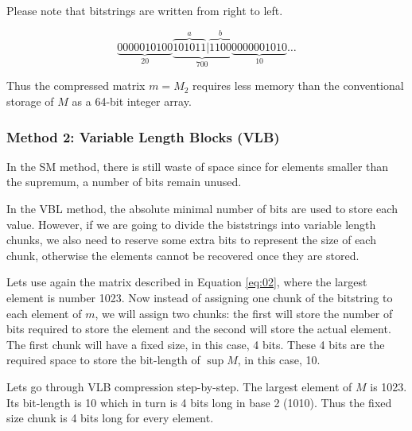 \documentclass[10pt]{article}
\begin{document}
 Please note that bitstrings are written from right to left.

\begin{equation*}\label{eq:8}
  \underbrace{0000010100}_{20}\underbrace{\overbrace{101011}^a|\overbrace{1100}^{b}}_{700}\underbrace{0000001010}_{10}\ldots
\end{equation*}

Thus the compressed matrix $m = M_2$ requires less memory than the conventional storage of $M$ as a 64-bit integer array.

\subsubsection*{Method 2: Variable Length Blocks (VLB)}

In the SM method, there is still waste of space since for elements smaller than the supremum, a number of bits remain unused.

In the VBL method, the absolute minimal number of bits are used to store each value. However, if we are going to divide the biststrings into variable length chunks, we also need to reserve some extra bits to represent the size of each chunk, otherwise the elements cannot be recovered once they are stored.

Lets use again the matrix described in Equation \ref{eq:02}, where  the largest element is number 1023. Now instead of assigning one chunk of the bitstring to each element of $m$, we will assign two chunks: the first will store the number of bits required to store the element and the second  will store the actual element. The first chunk will have a fixed size, in this case, 4 bits. These 4 bits are the required space to store the bit-length of $\sup M $, in this case, 10. 

Lets go through VLB compression step-by-step. The largest element of $M$ is 1023. Its bit-length is 10 which in turn is 4 bits long in base 2 (1010). Thus the fixed size chunk is 4 bits long for every element.
\end{document}
